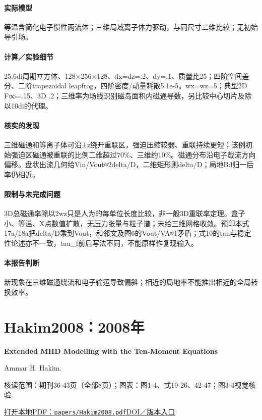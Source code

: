 \documentclass[UTF8,a4paper,11pt,openany,fontset=fandol]{ctexbook}
\begin{document}
\paragraph{实际模型}等温含简化电子惯性两流体；三维局域离子体力驱动，与同尺寸二维比较；无初始导引场。

\paragraph{计算／实验细节}25.6di周期立方体、128×256×128、dx=dz=.2、dy=.1、质量比25；四阶空间差分、二阶trapezoidal leapfrog，四阶密度/动量耗散5.1e-5。wx=wz=5；典型2D F∞=.15、3D .2；三维率为场线识别磁岛面积内磁通导数，另比较中心切片及除以10di的代理。

\paragraph{核实的发现}三维磁通和等离子体可沿±z绕开重联区，强迫压缩较弱、重联持续更短；该例初始强迫区磁通被重联的比例二维超过70\%、三维约10\%。磁通分布沿电子载流方向偏移。盘状出流几何给Vin/Vout≈2delta/D，二维矩形则delta/D；局地Bd归一后率仍相近。

\paragraph{限制与未完成问题}3D总磁通率除以2wz只是人为的每单位长度比较，非一般3D重联率定理。盒子小、等温、X点数值扩散，无压力张量与粒子谱；未给三维网格收敛。预印本式17a/18a把delta/D乘到Vout，和邻文及图6的Vout/VA≈1矛盾；式10的tan与稳定性论述亦不一致，tau\_f前后写法不同，不能原样作复现输入。

\paragraph{本报告判断}新现象在三维磁通绕流和电子输运导致偏斜；相近的局地率不能推出相近的全局转换效率。

\section{Hakim2008：2008年}\label{paper:Hakim2008}

\textbf{Extended MHD Modelling with the Ten-Moment Equations}\citep{Hakim2008}\

Ammar H. Hakim.

\textsf{核读范围：}期刊36-43页（全部8页）；\textsf{图表：}图1-4、式19-26、42-47；图3-4视觉核验.

\href{run:../papers/Hakim2008.pdf}{打开本地PDF：\texttt{papers/Hakim2008.pdf}}\quad\href{https://doi.org/10.1007/s10894-007-9116-z}{DOI／版本入口}
\end{document}
